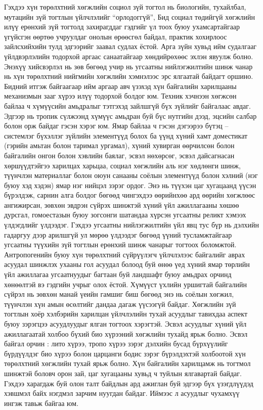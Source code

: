 Гэхдээ хүн төрөлхтний хөгжлийн социол зүй тогтол нь биологийн, тухайлбал, мутацийн зүй тогтлын үйлчлэлийг “орлодоггүй”, Бид социал төдийгүй хөгжлийн илүү ерөнхий зүй тогтолд захирагддаг гэдгийг үл тоох буюу ухамсартайгаар үгүйсгэн өөртөө учруулдаг онолын өрөөсгөл байдал, практик хохирлоос зайлсхийхийн тулд эдгээрийг заавал судлах ёстой.
Арга зүйн хувьд ийм судалгааг үйлдвэрлэлийн тодорхой аргаас санаатайгаар хөндийрөхөөс эхлэн явуулж болно. Энэхүү хийсвэрлэл нь зөв бөгөөд учир нь угсаатны нийлэгжилтийн шинж чанар нь хүн төрөлхтний нийгмийн хөгжлийн хэмнэлээс эрс ялгаатай байдагт оршино. Бидний итгэж байгаагаар ийм аргаар авч үзэхэд хүн байгалийн харилцааны механизмын зааг хүрээ илүү тодорхой болдог юм.
Техник хэчнээн хөгжсөн байлаа ч хүмүүсийн амьдралыг тэтгэхэд зайлшгүй бүх зүйлийг байгалаас авдаг. Эдгээр нь тропик сүлжээнд хүмүүс амьдран буй бүс нутгийн дээд, эцсийн салбар болон орж байдаг гэсэн хэрэг юм. Ямар байлаа ч гэсэн дэгээрээ бүтэц – системлэг бүхэллэг зүйлийн элементүүд болох ба үүнд хүний хамт доместикат (гэрийн амьтан болон таримал ургамал), хүний хувирган өөрчилсөн болон байгалийн онгон болон хэвлийн баялаг, эсвэл нөхөрсөг, эсвэл дайсагнасан хөршүүдтэйгээ харилцах харьцаа, социал хөгжлийн аль нэг хөдлөнги шинж, түүнчлэн материаллаг болон оюун санааны соёлын элементүүд болон хэлний (нэг буюу хэд хэдэн) ямар нэг нийцэл зэрэг ордог.
Энэ нь түүхэн цаг хугацаанд үүсэн бүрэлдэж, сарнин алга болдог бөгөөд чингэхдээ өөрийнхөө ард өөрийн хөгжлөөс ангижирсан, зөвхөн эвдрэн сүйрэх шинжтэй хүний үйл ажиллагааны хөшөө дурсгал, гомоестазын буюу зогсонги шатандаа хүрсэн угсаатны реликт хэмээх үлдэгдлийг үлдээдэг. Гэхдээ угсаатны нийлэгжилтийн үйл явц тус бүр нь дэлхийн гадаргуу дээр арилшгүй ул мөрөө үлдээдэг бөгөөд үүний тусламжтайгаар угсаатны түүхийн зүй тогтлын ерөнхий шинж чанарыг тогтоох боломжтой. Антропогенийн буюу хүн төрөлхтний сүйрүүлэгч үйлчлэлээс байгалийг аврах асуудал шинжлэх ухааны гол асуудал болоод буй өнөө үед хүний ямар төрлийн үйл ажиллагаа угсаатнуудыг багтаан буй ландшафт буюу амьдрах орчинд хөнөөлтэй вэ гэдгийн учрыг олох ёстой. Хүмүүст үхлийн уршигтай байгалийн сүйрэл нь зөвхөн манай үеийн гамшиг биш бөгөөд энэ нь соёлын хөгжил, түүнчлэн хүн амын өсөлтийг дандаа дагаж үүсээгүй байдаг.
Хөгжлийн зүй тогтлын хоёр хэлбэрийн харилцан үйлчлэлийн тухай асуудлыг тавихдаа аспект буюу зэрэгцээ асуудлуудыг ялган тогтоох хэрэгтэй. Эсвэл асуудлыг хүний үйл ажиллагаатай холбоо бүхий био хүрээний хөгжлийн тухайд ярьж болно. Эсвэл байгал орчин : лито хүрээ, тропо хүрээ зэрэг дэлхийн бусад бүрхүүлийг бүрдүүлдэг био хүрээ болон царцанги бодис зэрэг бүрэлдэхтэй холбоотой хүн төрөлхтний хөгжлийн тухай ярьж болно. Хүн байгалийн харилцамж нь тогтмол шинжтэй боловч орон зай, цаг хугацааны хувьд ч туйлын ялгавартай байдаг. Гэхдээ харагдаж буй олон талт байдлын ард ажиглан буй эдгээр бүх үзэгдлүүдэд хэвшмэл байх нэгдмэл зарчим нуугдан байдаг. Иймээс л асуудлыг чухамхүү ингэж тавьж байгаа юм.
